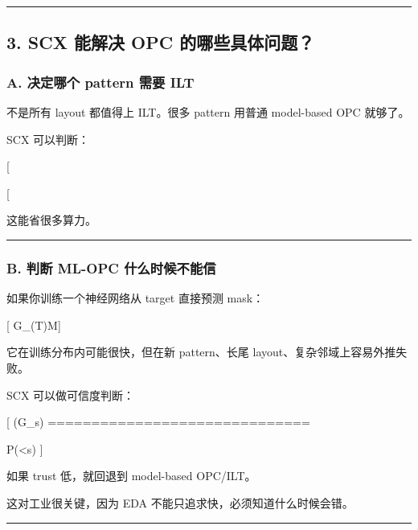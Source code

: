 \documentclass[
  12pt,
]{ctexart}
\begin{document}
\begin{center}\rule{0.5\linewidth}{0.5pt}\end{center}

\subsection{3. SCX 能解决 OPC
的哪些具体问题？}\label{scx-ux80fdux89e3ux51b3-opc-ux7684ux54eaux4e9bux5177ux4f53ux95eeux9898}

\subsubsection{A. 决定哪个 pattern 需要
ILT}\label{a.-ux51b3ux5b9aux54eaux4e2a-pattern-ux9700ux8981-ilt}

不是所有 layout 都值得上 ILT。很多 pattern 用普通 model-based OPC
就够了。

SCX 可以判断：

{[}  \Rightarrow \text{rule/model OPC}{]}

{[} 
\Rightarrow \text{ILT or high-fidelity simulation}{]}

这能省很多算力。

\begin{center}\rule{0.5\linewidth}{0.5pt}\end{center}

\subsubsection{B. 判断 ML-OPC
什么时候不能信}\label{b.-ux5224ux65ad-ml-opc-ux4ec0ux4e48ux65f6ux5019ux4e0dux80fdux4fe1}

如果你训练一个神经网络从 target 直接预测 mask：

{[} G\_\theta(T)\rightarrow M{]}

它在训练分布内可能很快，但在新 pattern、长尾
layout、复杂邻域上容易外推失败。

SCX 可以做可信度判断：

{[} (G\_\theta\mid s) ==============================

P(\textless{}\tau \mid s) {]}

如果 trust 低，就回退到 model-based OPC/ILT。

这对工业很关键，因为 EDA 不能只追求快，必须知道什么时候会错。

\begin{center}\rule{0.5\linewidth}{0.5pt}\end{center}
\end{document}
